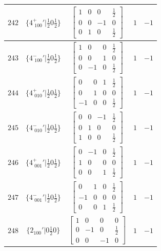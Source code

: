 \documentclass[fleqn,8pt]{jsarticle}
\begin{document}
\begin{longtable}{ccccc}
$ 242 $ & $ \{4^{+}_{\,\,100}{}'|\frac{1}{2} 0 \frac{1}{2}\} $ & $ \begin{bmatrix} 1 & 0 & 0 & \frac{1}{2} \\ 0 & 0 & -1 & 0 \\ 0 & 1 & 0 & \frac{1}{2} \end{bmatrix} $ & $ 1 $ & $ -1 $ \\ \hline
$ 243 $ & $ \{4^{-}_{\,\,100}{}'|\frac{1}{2} 0 \frac{1}{2}\} $ & $ \begin{bmatrix} 1 & 0 & 0 & \frac{1}{2} \\ 0 & 0 & 1 & 0 \\ 0 & -1 & 0 & \frac{1}{2} \end{bmatrix} $ & $ 1 $ & $ -1 $ \\ \hline
$ 244 $ & $ \{4^{+}_{\,\,010}{}'|\frac{1}{2} 0 \frac{1}{2}\} $ & $ \begin{bmatrix} 0 & 0 & 1 & \frac{1}{2} \\ 0 & 1 & 0 & 0 \\ -1 & 0 & 0 & \frac{1}{2} \end{bmatrix} $ & $ 1 $ & $ -1 $ \\ \hline
$ 245 $ & $ \{4^{-}_{\,\,010}{}'|\frac{1}{2} 0 \frac{1}{2}\} $ & $ \begin{bmatrix} 0 & 0 & -1 & \frac{1}{2} \\ 0 & 1 & 0 & 0 \\ 1 & 0 & 0 & \frac{1}{2} \end{bmatrix} $ & $ 1 $ & $ -1 $ \\ \hline
$ 246 $ & $ \{4^{+}_{\,\,001}{}'|\frac{1}{2} 0 \frac{1}{2}\} $ & $ \begin{bmatrix} 0 & -1 & 0 & \frac{1}{2} \\ 1 & 0 & 0 & 0 \\ 0 & 0 & 1 & \frac{1}{2} \end{bmatrix} $ & $ 1 $ & $ -1 $ \\ \hline
$ 247 $ & $ \{4^{-}_{\,\,001}{}'|\frac{1}{2} 0 \frac{1}{2}\} $ & $ \begin{bmatrix} 0 & 1 & 0 & \frac{1}{2} \\ -1 & 0 & 0 & 0 \\ 0 & 0 & 1 & \frac{1}{2} \end{bmatrix} $ & $ 1 $ & $ -1 $ \\ \hline
$ 248 $ & $ \{2{}_{100}{}'|0 \frac{1}{2} 0\} $ & $ \begin{bmatrix} 1 & 0 & 0 & 0 \\ 0 & -1 & 0 & \frac{1}{2} \\ 0 & 0 & -1 & 0 \end{bmatrix} $ & $ 1 $ & $ -1 $ \\ \hline

\end{longtable}
\end{document}
